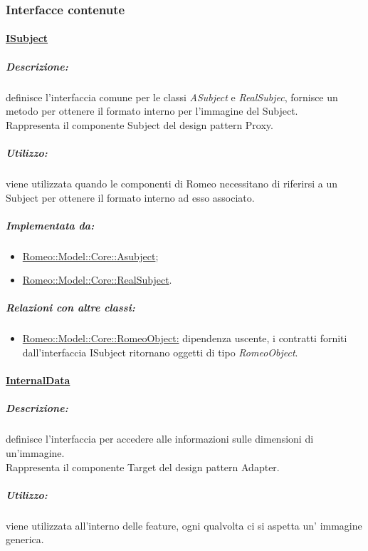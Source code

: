 		\subsubsection{Interfacce contenute}
		\label{int_contenute}
			\paragraph{\underline{ISubject}}
				
				\subparagraph{Descrizione:} definisce l’interfaccia comune per le classi \textsl{ASubject} e \textsl{RealSubjec}, fornisce un metodo per ottenere il formato interno per l’immagine del Subject\g{}.
				\\Rappresenta il componente Subject del design pattern\g{} Proxy.
				\label{core_isub}
				
				\subparagraph{Utilizzo:} viene utilizzata quando le componenti di Romeo\g{} necessitano di riferirsi a un Subject\g{} per ottenere il formato interno ad esso associato. 
				
				\subparagraph{Implementata da:}
					\begin{itemize}
						\item \hyperref[core_asub]{Romeo::Model::Core::Asubject};
						\item \hyperref[core_realsub]{Romeo::Model::Core::RealSubject}.
					\end{itemize}
					
				\subparagraph{Relazioni con altre classi:}
					\begin{itemize}
						\item \hyperref[RomeoObject]{Romeo::Model::Core::RomeoObject:} dipendenza uscente, i contratti forniti dall'interfaccia ISubject ritornano oggetti di tipo \textsl{RomeoObject}.
					\end{itemize}
			
			\pagebreak
		
			\paragraph{\underline{InternalData}}
			\label{internaldata}
			
				\subparagraph{Descrizione:} definisce l'interfaccia per accedere alle informazioni sulle dimensioni di un'immagine.
				\\Rappresenta il componente Target del design pattern\g{} Adapter.
				
				\subparagraph{Utilizzo:} viene utilizzata all'interno delle feature, ogni qualvolta ci si aspetta un' immagine generica.
				
